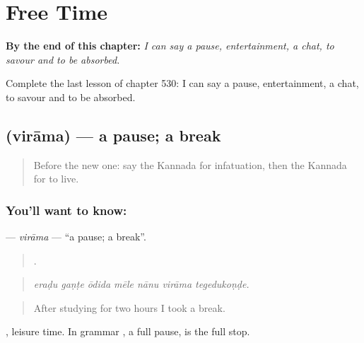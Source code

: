 
\chapter{Free Time}
\label{ch:ka-free-time}

\begin{chapteropening}
\textbf{By the end of this chapter:} \emph{I can say a pause, entertainment, a chat, to savour and to be absorbed.}

Complete the last lesson of chapter 530: I can say a pause, entertainment, a chat, to savour and to be absorbed.
\end{chapteropening}

\section[\texorpdfstring{\kn{ವಿರಾಮ} (virāma)}{ವಿರಾಮ (virāma)}]{ (virāma) — a pause; a break}

\label{lesson:KA-C530-virama}



\begin{quote}
Before the new one: say the Kannada for infatuation, then the Kannada for to live.
\end{quote}

\subsection*{You'll want to know: }
\textbf{} — \emph{virāma} — \textquotedblleft{}a pause; a break\textquotedblright{}.

\begin{quote}
      .
\end{quote}

\begin{quote}
\emph{eraḍu gaṇṭe ōdida mēle nānu virāma tegedukoṇḍe.}
\end{quote}

\begin{quote}
After studying for two hours I took a break.
\end{quote}

 , leisure time. In grammar , a full pause, is the full stop.

